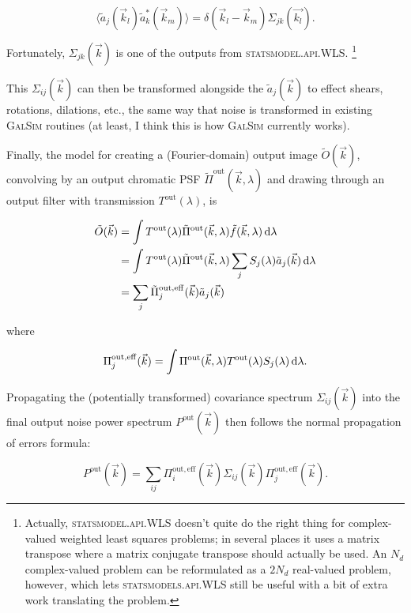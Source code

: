 \documentclass{article}
\begin{document}
\begin{equation}
    \langle\tilde{a}_j(\vec{k}_l)\tilde{a}^*_k(\vec{k}_m)\rangle = \delta(\vec{k}_l - \vec{k}_m)\Sigma_{jk}(\vec{k_l}).
\end{equation}

Fortunately, $\Sigma_{jk}(\vec{k})$ is one of the outputs from \textsc{statsmodel.api.WLS}.
\footnote{Actually, \textsc{statsmodel.api.WLS} doesn't quite do the right thing for complex-valued
weighted least squares problems; in several places it uses a matrix transpose where a matrix
conjugate transpose should actually be used.  An $N_d$ complex-valued problem can be reformulated as
a $2 N_d$ real-valued problem, however, which lets \textsc{statsmodels.api.WLS} still be useful with
a bit of extra work translating the problem.}

This $\Sigma_{ij}(\vec{k})$ can then be transformed alongside the $\tilde{a}_j(\vec{k})$ to effect
shears, rotations, dilations, etc., the same way that noise is transformed in existing
\textsc{GalSim} routines (at least, I think this is how \textsc{GalSim} currently works).

Finally, the model for creating a (Fourier-domain) output image $\tilde{O}(\vec{k})$, convolving by
an output chromatic PSF $\tilde{\Pi}^\mathrm{out}(\vec{k}, \lambda)$ and drawing through an output
filter with transmission $T^\mathrm{out}(\lambda)$, is

\begin{align}
    \tilde{O}(\vec{k})
    &= \int T^\mathrm{out}(\lambda) \tilde{\Pi}^\mathrm{out}(\vec{k}, \lambda) \tilde{f}(\vec{k}, \lambda) \dif{\lambda} \\
    &= \int T^\mathrm{out}(\lambda) \tilde{\Pi}^\mathrm{out}(\vec{k}, \lambda) \sum_j S_j(\lambda) \tilde{a}_j(\vec{k}) \dif{\lambda} \\
    &= \sum_j \tilde{\Pi}_j^\mathrm{out, eff}(\vec{k}) \tilde{a}_j(\vec{k})
\end{align}

where

\begin{equation}
  \Pi_j^\mathrm{out, eff}(\vec{k}) = \int \Pi^\mathrm{out}(\vec{k}, \lambda) T^\mathrm{out}(\lambda) S_j(\lambda)\dif{\lambda}.
\end{equation}

Propagating the (potentially transformed) covariance spectrum $\Sigma_{ij}(\vec{k})$ into the final
output noise power spectrum $P^\mathrm{out}(\vec{k})$ then follows the normal propagation of errors
formula:

\begin{equation}
  P^\mathrm{out}(\vec{k}) = \sum_{ij} \Pi_i^\mathrm{out, eff}(\vec{k}) \Sigma_{ij}(\vec{k}) \Pi_j^\mathrm{out, eff}(\vec{k}).
\end{equation}
\end{document}
